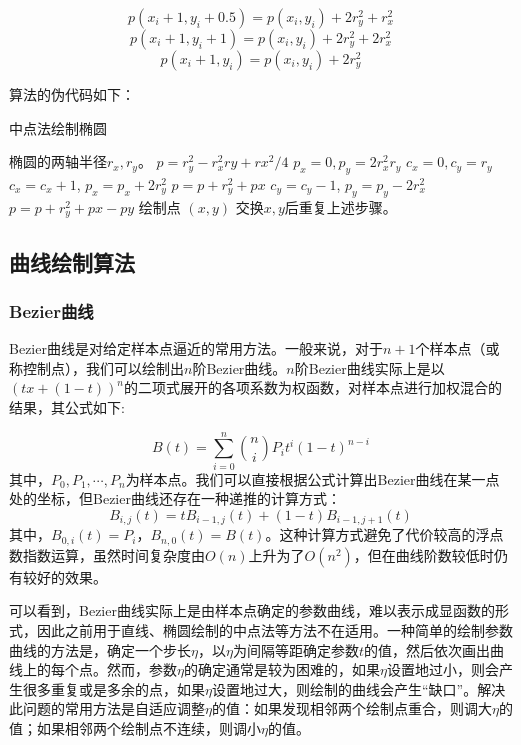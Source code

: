 \documentclass[a4paper,12pt]{article}
\begin{document}
$$ p(x_i+1, y_i+0.5) = p(x_i, y_i) + 2r_y^2 + r_x^2 $$
$$ p(x_i+1, y_i+1) = p(x_i, y_i) + 2r_y^2 + 2r_x^2 $$
$$ p(x_i+1, y_i) = p(x_i, y_i) + 2r_y^2 $$

算法的伪代码如下：

\begin{algorithm}[htb] 
	\caption{中点法绘制椭圆} 
	\label{alg:Midpoint} 
	\begin{algorithmic}[1] 
		\Require 
		椭圆的两轴半径$r_x, r_y$。
		\State $p = r_y^2 - r_x^2 ry + rx^2 / 4$
		\State $p_x = 0, p_y = 2r_x^2r_y$
		\State $c_x = 0, c_y = r_y$
		\State $c_x = c_x + 1$, $p_x = p_x + 2 r_y^2$ 
		\State $p = p + r_y^2 + px$
		\Else
		\State $c_y = c_y - 1$, $p_y = p_y - 2 r_x^2$
		\State $p = p + r_y^2 + px - py$
		\EndIf
		\State 绘制点 $(x, y)$
		\EndWhile
		\State 交换$x, y$后重复上述步骤。
	\end{algorithmic} 
\end{algorithm}

\subsection{曲线绘制算法}
\subsubsection{Bezier曲线}
Bezier曲线是对给定样本点逼近的常用方法。一般来说，对于$n+1$个样本点（或称控制点），我们可以绘制出$n$阶Bezier曲线。$n$阶Bezier曲线实际上是以$(tx+(1-t))^n$的二项式展开的各项系数为权函数，对样本点进行加权混合的结果，其公式如下:

$$ B(t) = \sum_{i=0}^n \binom{n}{i} P_i t^i (1-t)^{n-i} $$
其中，$P_0, P_1, \cdots, P_n$为样本点。我们可以直接根据公式计算出Bezier曲线在某一点处的坐标，但Bezier曲线还存在一种递推的计算方式：
$$ B_{i, j}(t) = t B_{i-1, j}(t) + (1-t) B_{i-1, j+1}(t) $$
其中，$B_{0, i}(t) = P_i$，$B_{n, 0}(t) = B(t)$。这种计算方式避免了代价较高的浮点数指数运算，虽然时间复杂度由$O(n)$上升为了$O(n^2)$，但在曲线阶数较低时仍有较好的效果。

可以看到，Bezier曲线实际上是由样本点确定的参数曲线，难以表示成显函数的形式，因此之前用于直线、椭圆绘制的中点法等方法不在适用。一种简单的绘制参数曲线的方法是，确定一个步长$\eta$，以$\eta$为间隔等距确定参数$t$的值，然后依次画出曲线上的每个点。然而，参数$\eta$的确定通常是较为困难的，如果$\eta$设置地过小，则会产生很多重复或是多余的点，如果$\eta$设置地过大，则绘制的曲线会产生“缺口”。解决此问题的常用方法是自适应调整$\eta$的值：如果发现相邻两个绘制点重合，则调大$\eta$的值；如果相邻两个绘制点不连续，则调小$\eta$的值。
\end{document}
